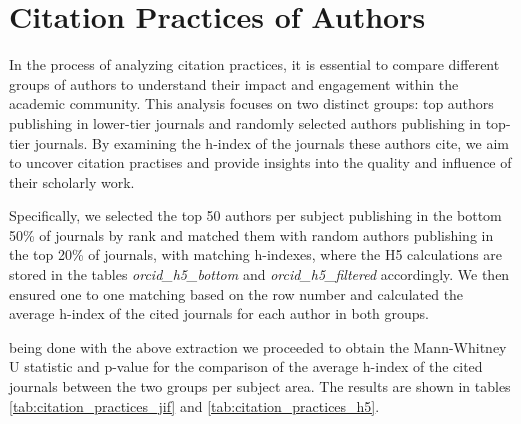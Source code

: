 \section{Citation Practices of Authors}

In the process of analyzing citation practices, it is essential to compare
different groups of authors to understand their impact and engagement within
the academic community. This analysis focuses on two distinct groups: top
authors publishing in lower-tier journals and randomly selected authors
publishing in top-tier journals. By examining the h-index of the journals these
authors cite, we aim to uncover citation practises and provide insights into
the quality and influence of their scholarly work.

Specifically, we selected the top 50 authors per subject publishing in the
bottom 50\% of journals by rank and matched them with random authors publishing
in the top 20\% of journals, with matching h-indexes, where the H5 calculations
are stored in the tables \emph{orcid\_h5\_bottom} and
\emph{orcid\_h5\_filtered} accordingly. We then ensured one to one matching
based on the row number and calculated the average h-index of the cited
journals for each author in both groups.

being done with the above extraction we proceeded to obtain the Mann-Whitney U
statistic and p-value for the comparison of the average h-index of the cited
journals between the two groups per subject area. The results are shown in
tables \ref{tab:citation_practices_jif} and \ref{tab:citation_practices_h5}.

